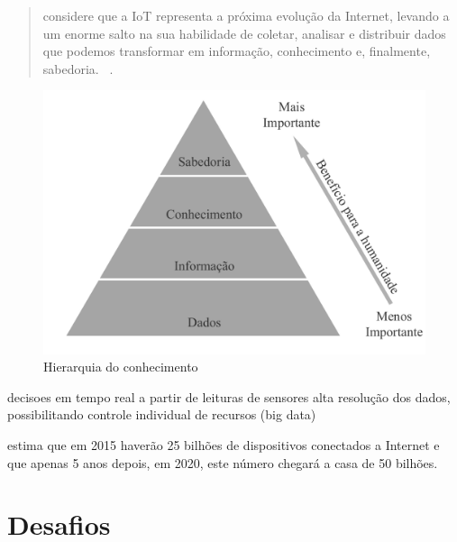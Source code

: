 \documentclass[twoside,english,brazilian]{UNISINOSmonografia}
\begin{document}
	\begin{quote}
		considere que a IoT representa a próxima evolução da Internet, 
		levando a um enorme salto na sua habilidade de coletar, analisar e 
		distribuir dados que podemos transformar em informação, 
		conhecimento e, finalmente, sabedoria.~
		\cite[p.~2]{Cisco2011}.
	\end{quote}
	
	\begin{figure}
		\caption{Hierarquia do conhecimento}
		\label{fig:wkid}
		\centering
		\begin{minipage}{.8\textwidth}
			\includegraphics[width=\textwidth]{wkid}
		\end{minipage}
	\end{figure}
	
	decisoes em tempo real a partir de leituras de sensores
	alta resolução dos dados, possibilitando controle individual de recursos 
	(big data)
	
	
	 estima que em 2015 haverão 25 bilhões de 
	dispositivos conectados a Internet e que apenas 5 anos depois, em 
	2020, este número chegará a casa de 50 bilhões.

\section{Desafios}

\end{document}

